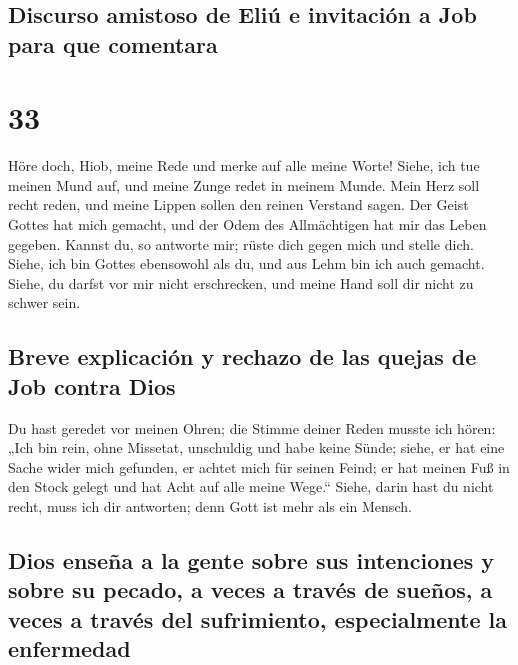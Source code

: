 \hypertarget{discurso-amistoso-de-eliuxfa-e-invitaciuxf3n-a-job-para-que-comentara}{%
\subsection{Discurso amistoso de Eliú e invitación a Job para que
comentara}\label{discurso-amistoso-de-eliuxfa-e-invitaciuxf3n-a-job-para-que-comentara}}

\hypertarget{section-32}{%
\section{33}\label{section-32}}

 Höre doch, Hiob, meine Rede und merke auf alle meine
Worte!  Siehe, ich tue meinen Mund auf, und meine Zunge
redet in meinem Munde.  Mein Herz soll recht reden, und
meine Lippen sollen den reinen Verstand sagen.  Der Geist
Gottes hat mich gemacht, und der Odem des Allmächtigen hat mir das Leben
gegeben.  Kannst du, so antworte mir; rüste dich gegen
mich und stelle dich.  Siehe, ich bin Gottes ebensowohl
als du, und aus Lehm bin ich auch gemacht.  Siehe, du
darfst vor mir nicht erschrecken, und meine Hand soll dir nicht zu
schwer sein.

\hypertarget{breve-explicaciuxf3n-y-rechazo-de-las-quejas-de-job-contra-dios}{%
\subsection{Breve explicación y rechazo de las quejas de Job contra
Dios}\label{breve-explicaciuxf3n-y-rechazo-de-las-quejas-de-job-contra-dios}}

 Du hast geredet vor meinen Ohren; die Stimme deiner Reden
musste ich hören:  „Ich bin rein, ohne Missetat,
unschuldig und habe keine Sünde;  siehe, er hat eine
Sache wider mich gefunden, er achtet mich für seinen Feind;
 er hat meinen Fuß in den Stock gelegt und hat Acht auf
alle meine Wege.``  Siehe, darin hast du nicht recht,
muss ich dir antworten; denn Gott ist mehr als ein Mensch.

\hypertarget{dios-enseuxf1a-a-la-gente-sobre-sus-intenciones-y-sobre-su-pecado-a-veces-a-travuxe9s-de-sueuxf1os-a-veces-a-travuxe9s-del-sufrimiento-especialmente-la-enfermedad}{%
\subsection{Dios enseña a la gente sobre sus intenciones y sobre su
pecado, a veces a través de sueños, a veces a través del sufrimiento,
especialmente la
enfermedad}\label{dios-enseuxf1a-a-la-gente-sobre-sus-intenciones-y-sobre-su-pecado-a-veces-a-travuxe9s-de-sueuxf1os-a-veces-a-travuxe9s-del-sufrimiento-especialmente-la-enfermedad}}

